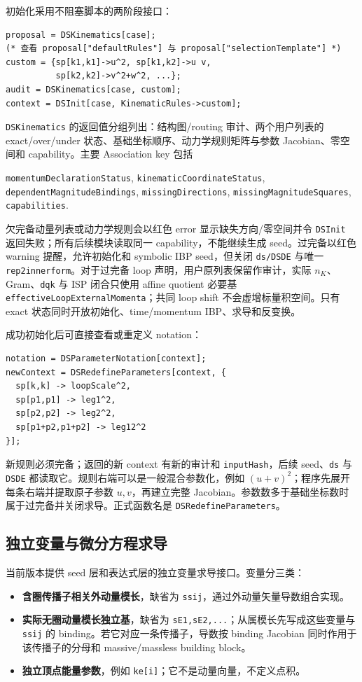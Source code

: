 ﻿\documentclass[a4paper,11pt]{article}
\begin{document}
初始化采用不阻塞脚本的两阶段接口：
\begin{verbatim}
proposal = DSKinematics[case];
(* 查看 proposal["defaultRules"] 与 proposal["selectionTemplate"] *)
custom = {sp[k1,k1]->u^2, sp[k1,k2]->u v,
          sp[k2,k2]->v^2+w^2, ...};
audit = DSKinematics[case, custom];
context = DSInit[case, KinematicRules->custom];
\end{verbatim}
\texttt{DSKinematics} 的返回值分组列出：结构图/routing 审计、两个用户列表的 exact/over/under 状态、基础坐标顺序、动力学规则矩阵与参数 Jacobian、零空间和 capability。主要 Association key 包括
\begin{center}
\texttt{momentumDeclaration\allowbreak Status},
\texttt{kinematicCoordinate\allowbreak Status},
\texttt{dependentMagnitudeBindings},
\texttt{missingDirections},
\texttt{missingMagnitudeSquares},
\texttt{capabilities}.
\end{center}
欠完备动量列表或动力学规则会以红色 error 显示缺失方向/零空间并令 \texttt{DSInit} 返回失败；所有后续模块读取同一 capability，不能继续生成 seed。过完备以红色 warning 提醒，允许初始化和 symbolic IBP seed，但关闭 \texttt{ds/DSDE} 与唯一 \texttt{rep2innerform}。对于过完备 loop 声明，用户原列表保留作审计，实际 $n_K$、Gram、\texttt{dqk} 与 ISP 闭合只使用 affine quotient 必要基 \texttt{effectiveLoopExternalMomenta}；共同 loop shift 不会虚增标量积空间。只有 exact 状态同时开放初始化、time/momentum IBP、求导和反变换。

成功初始化后可直接查看或重定义 notation：
\begin{verbatim}
notation = DSParameterNotation[context];
newContext = DSRedefineParameters[context, {
  sp[k,k] -> loopScale^2,
  sp[p1,p1] -> leg1^2,
  sp[p2,p2] -> leg2^2,
  sp[p1+p2,p1+p2] -> leg12^2
}];
\end{verbatim}
新规则必须完备；返回的新 context 有新的审计和 \texttt{inputHash}，后续 seed、\texttt{ds} 与 \texttt{DSDE} 都读取它。规则右端可以是一般混合参数化，例如 $(u+v)^2$；程序先展开每条右端并提取原子参数 $u,v$，再建立完整 Jacobian。参数数多于基础坐标数时属于过完备并关闭求导。正式函数名是 \texttt{DSRedefineParameters}。

\subsection{独立变量与微分方程求导}

当前版本提供 seed 层和表达式层的独立变量求导接口。变量分三类：
\begin{itemize}
  \item \textbf{含圈传播子相关外动量模长}，缺省为 \texttt{ssij}，通过外动量矢量导数组合实现。
  \item \textbf{实际无圈动量模长独立基}，缺省为 \texttt{sE1,sE2,...}；从属模长先写成这些变量与 \texttt{ssij} 的 binding。若它对应一条传播子，导数按 binding Jacobian 同时作用于该传播子的分母和 massive/massless building block。
  \item \textbf{独立顶点能量参数}，例如 \texttt{ke[i]}；它不是动量向量，不定义点积。
\end{itemize}
\end{document}
